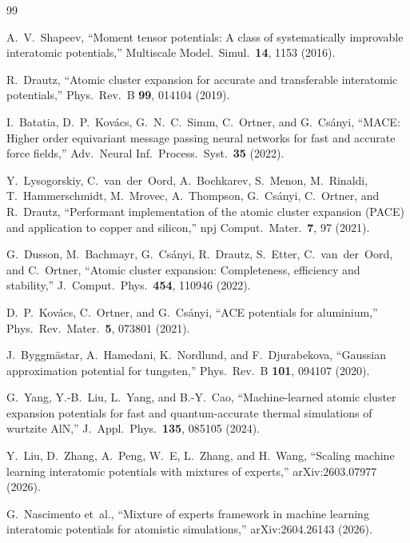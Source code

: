 \documentclass[twoside,prb,aps,floatfix,superscriptaddress,longbibliography]{revtex4-2}
\begin{document}

\begin{thebibliography}{99}

A.~V.~Shapeev, ``Moment tensor potentials: A class of systematically improvable interatomic potentials,'' Multiscale Model.\ Simul.\ \textbf{14}, 1153 (2016).

R.~Drautz, ``Atomic cluster expansion for accurate and transferable interatomic potentials,'' Phys.\ Rev.\ B \textbf{99}, 014104 (2019).

I.~Batatia, D.~P.~Kov\'{a}cs, G.~N.~C.~Simm, C.~Ortner, and G.~Cs\'{a}nyi, ``MACE: Higher order equivariant message passing neural networks for fast and accurate force fields,'' Adv.\ Neural Inf.\ Process.\ Syst.\ \textbf{35} (2022).

Y.~Lysogorskiy, C.~van~der~Oord, A.~Bochkarev, S.~Menon, M.~Rinaldi, T.~Hammerschmidt, M.~Mrovec, A.~Thompson, G.~Cs\'{a}nyi, C.~Ortner, and R.~Drautz, ``Performant implementation of the atomic cluster expansion (PACE) and application to copper and silicon,'' npj Comput.\ Mater.\ \textbf{7}, 97 (2021).

G.~Dusson, M.~Bachmayr, G.~Cs\'{a}nyi, R.~Drautz, S.~Etter, C.~van~der~Oord, and C.~Ortner, ``Atomic cluster expansion: Completeness, efficiency and stability,'' J.\ Comput.\ Phys.\ \textbf{454}, 110946 (2022).

D.~P.~Kov\'{a}cs, C.~Ortner, and G.~Cs\'{a}nyi, ``ACE potentials for aluminium,'' Phys.\ Rev.\ Mater.\ \textbf{5}, 073801 (2021).

J.~Byggm\"{a}star, A.~Hamedani, K.~Nordlund, and F.~Djurabekova, ``Gaussian approximation potential for tungsten,'' Phys.\ Rev.\ B \textbf{101}, 094107 (2020).

G.~Yang, Y.-B.~Liu, L.~Yang, and B.-Y.~Cao, ``Machine-learned atomic cluster expansion potentials for fast and quantum-accurate thermal simulations of wurtzite AlN,'' J.\ Appl.\ Phys.\ \textbf{135}, 085105 (2024).

Y.~Liu, D.~Zhang, A.~Peng, W.~E, L.~Zhang, and H.~Wang, ``Scaling machine learning interatomic potentials with mixtures of experts,'' arXiv:2603.07977 (2026).

G.~Nascimento et~al., ``Mixture of experts framework in machine learning interatomic potentials for atomistic simulations,'' arXiv:2604.26143 (2026).


\end{thebibliography}
\end{document}
